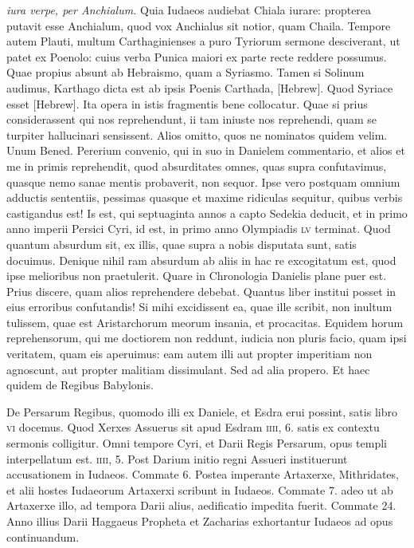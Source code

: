 \begin{parnumbers}
\textit{iura verpe, per Anchialum.}
\lnr{}Quia Iudaeos audiebat Chiala iurare:
propterea putavit esse Anchialum, quod vox Anchialus sit notior,
quam Chaila.
\lnr{}Tempore autem Plauti, multum Carthaginienses
a puro Tyriorum sermone desciverant, ut patet ex Poenolo:
cuius verba Punica maiori ex parte recte reddere possumus.
\lnr{}Quae propius absunt ab Hebraismo, quam a Syriasmo.
\lnr{}Tamen
si Solinum audimus, Karthago dicta est ab ipsis Poenis Carthada,
\texthebrew{[Hebrew]}.
\lnr{}Quod Syriace esset \texthebrew{[Hebrew]}.
\lnr{}Ita opera in istis fragmentis
bene collocatur.
\lnr{}Quae si prius considerassent qui nos reprehendunt,
ii tam iniuste nos reprehendi, quam se turpiter hallucinari
sensissent.
\lnr{}Alios omitto, quos ne nominatos quidem velim.
\lnr{}Unum Bened.
\lnr{}Pererium convenio, qui in suo in Danielem commentario,
et alios et me in primis reprehendit, quod absurditates
omnes, quas supra confutavimus, quasque nemo sanae mentis
probaverit, non sequor.
\lnr{}Ipse vero postquam omnium adductis sententiis,
pessimas quasque et maxime ridiculas sequitur, quibus verbis
castigandus est!
\lnr{}Is est, qui septuaginta annos a capto Sedekia
deducit, et in primo anno imperii Persici Cyri, id est, in primo
anno Olympiadis \textsc{lv} terminat.
\lnr{}Quod quantum absurdum sit, ex
illis, quae supra a nobis disputata sunt, satis docuimus.
\lnr{}Denique
nihil ram absurdum ab aliis in hac re excogitatum est, quod ipse
melioribus non praetulerit.
\lnr{}Quare in Chronologia Danielis plane
puer est.
\lnr{}Prius discere, quam alios reprehendere debebat.
\lnr{}Quantus liber institui posset in eius erroribus confutandis!
\lnr{}Si mihi excidissent
ea, quae ille scribit, non inultum tulissem, quae est Aristarchorum
meorum insania, et procacitas.
\lnr{}Equidem horum reprehensorum,
qui me doctiorem non reddunt, iudicia non pluris
facio, quam ipsi veritatem, quam eis aperuimus: eam autem illi aut
propter imperitiam non agnoscunt, aut propter malitiam dissimulant.
\lnr{}Sed ad alia propero.
\lnr{}Et haec quidem de Regibus Babylonis.

{}
\lnr{}De Persarum Regibus, quomodo illi ex Daniele, et Esdra erui possint,
satis libro \textsc{vi} docemus.
\lnr{}Quod Xerxes Assuerus sit apud Esdram
\textsc{iiii}, 6. satis ex contextu sermonis colligitur.
\lnr{}Omni tempore
Cyri, et Darii Regis Persarum, opus templi interpellatum est.
\textsc{iiii}, 5.
\lnr{}Post Darium initio regni Assueri instituerunt accusationem
in Iudaeos.
\lnr{}Commate 6.
\lnr{}Postea imperante Artaxerxe, Mithridates,
et alii hostes Iudaeorum Artaxerxi scribunt in Iudaeos.
\lnr{}Commate 7.
adeo ut ab Artaxerxe illo, ad tempora Darii alius, aedificatio impedita
fuerit.
\lnr{}Commate 24.
\lnr{}Anno illius Darii Haggaeus Propheta
et Zacharias exhortantur Iudaeos ad opus continuandum.


\end{parnumbers}
